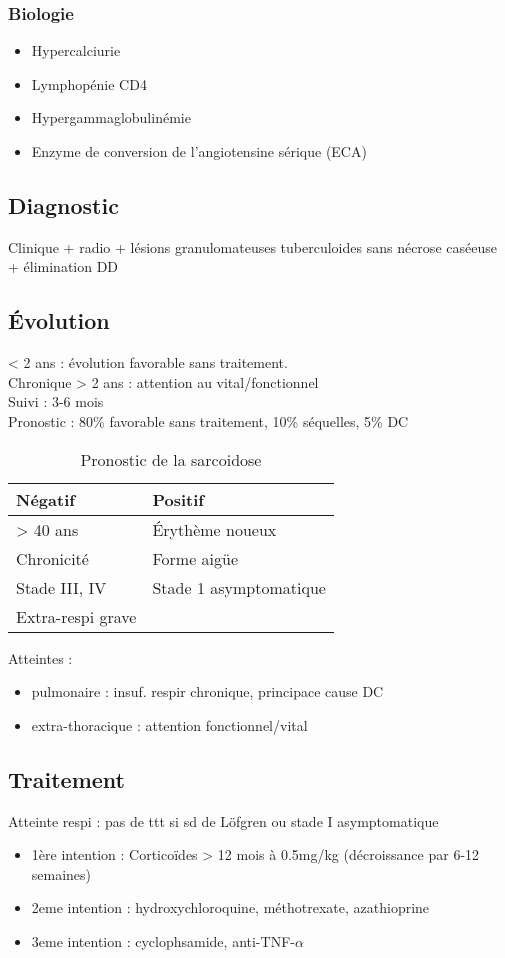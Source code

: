 \documentclass{article}
\begin{document}
\subsubsection{Biologie}
\label{sec:orgbfe5d87}
\begin{itemize}
\item Hypercalciurie
\item Lymphopénie CD4
\item Hypergammaglobulinémie
\item Enzyme de conversion de l'angiotensine sérique (ECA)
\end{itemize}
\subsection{Diagnostic}
\label{sec:org6670330}
Clinique + radio + lésions granulomateuses tuberculoides sans nécrose caséeuse +
élimination DD
\subsection{Évolution}
\label{sec:org707f9ea}
< 2 ans : évolution favorable sans traitement.\\
Chronique > 2 ans : attention au vital/fonctionnel \\
Suivi : 3-6 mois\\
Pronostic : 80\% favorable sans traitement, 10\% séquelles, 5\% DC

\begin{table}[htbp]
  \caption{Pronostic de la sarcoidose}
  \centering
  \begin{tabular}{ll}
    \toprule
    Négatif & Positif\\
    \midrule
    > 40 ans & Érythème noueux\\
    Chronicité & Forme aigüe\\
    Stade III, IV & Stade 1 asymptomatique\\
    Extra-respi grave & \\
    \bottomrule
  \end{tabular}
\end{table}

Atteintes :
\begin{itemize}
\item pulmonaire : insuf. respir chronique, principace cause DC
\item extra-thoracique : attention fonctionnel/vital
\end{itemize}

\subsection{Traitement}
\label{sec:orgc05b9f6}
Atteinte respi : pas de ttt si sd de Löfgren ou stade I asymptomatique\\
\begin{itemize}
\item 1ère intention : Corticoïdes > 12 mois à 0.5mg/kg (décroissance par 6-12 semaines)
\item 2eme intention : hydroxychloroquine, méthotrexate, azathioprine
\item 3eme intention : cyclophsamide, anti-TNF-\(\alpha\)
\end{itemize}
\end{document}
